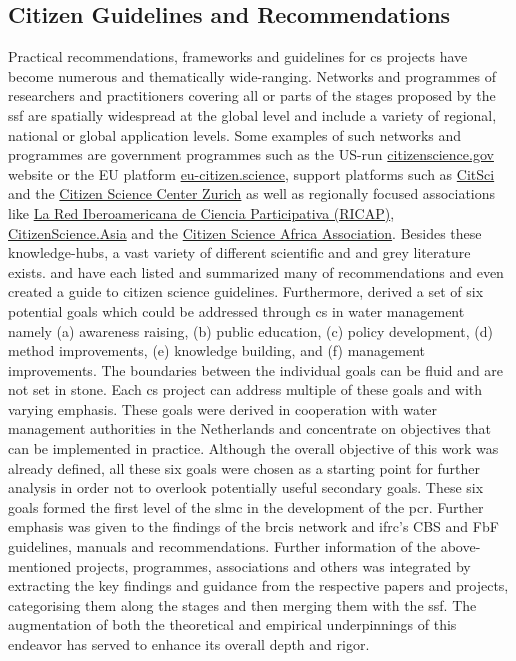 \subsection{Citizen Guidelines and Recommendations}

Practical recommendations, frameworks and guidelines for \acrlong*{cs} projects have become numerous and thematically wide-ranging. Networks and programmes of researchers and practitioners covering all or parts of the stages proposed by the \acrshort*{ssf} are spatially widespread at the global level and include a variety of regional, national or global application levels. Some examples of such networks and programmes are government programmes such as the US-run \href{https://www.citizenscience.gov/}{citizenscience.gov} website or the EU platform \href{https://eu-citizen.science/}{eu-citizen.science}, support platforms such as \href{https://citsci.org/}{CitSci} and the \href{https://citizenscience.ch/en/}{Citizen Science Center Zurich} as well as regionally focused associations like \href{http://cienciaparticipativa.net/la-ricap/}{La Red Iberoamericana de Ciencia Participativa (RICAP)}, \href{https://citizenscience.asia/}{CitizenScience.Asia} and the \href{https://www.usiu.ac.ke/citsci-africa-association/}{Citizen Science Africa Association}.\newline
Besides these knowledge-hubs, a vast variety of different scientific and and grey literature exists. \autocite{fraislCitizenScienceEnvironmental2022} and \autocite{westonCommunityBasedWaterMonitoring2015} have each listed and summarized many of recommendations and \autocite{garciaFindingWhatYou2021} even created a guide to citizen science guidelines. Furthermore, \autocite{minkmanCitizenScienceWater2015} derived a set of six potential goals which could be addressed through \acrlong*{cs} in water management namely (a) awareness raising, (b) public education, (c) policy development, (d) method improvements, (e) knowledge building, and (f) management improvements. The boundaries between the individual goals can be fluid and are not set in stone. Each \acrshort*{cs} project can address multiple of these goals and with varying emphasis. These goals were derived in cooperation with water management authorities in the Netherlands and concentrate on objectives that can be implemented in practice.
Although the overall objective of this work was already defined, all these six goals were chosen as a starting point for further analysis in order not to overlook potentially useful secondary goals. These six goals formed the first level of the \acrshort{slmc} in the development of the \acrshort{pcr}. Further emphasis was given to the findings of the \acrshort{brcis} network and \acrshort{ifrc}'s CBS and FbF guidelines, manuals and recommendations. Further information of the above-mentioned projects, programmes, associations and others was integrated by extracting the key findings and guidance from the respective papers and projects, categorising them along the stages and then merging them with the \acrshort{ssf}. The augmentation of both the theoretical and empirical underpinnings of this endeavor has served to enhance its overall depth and rigor.



